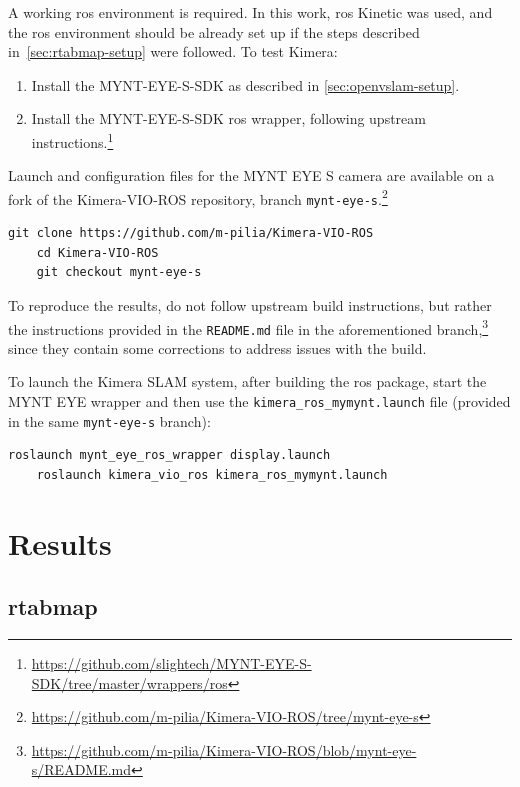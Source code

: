 \documentclass[11pt, letterpaper, twoside]{article}
\begin{document}
A working \gls{ros} environment is required. In this work, \gls{ros} Kinetic
was used, and the \gls{ros} environment should be already set up if the steps
described in~\cref{sec:rtabmap-setup} were followed. To test Kimera:

\begin{enumerate}
    \item Install the MYNT-EYE-S-SDK as described in \cref{sec:openvslam-setup}.

    \item Install the MYNT-EYE-S-SDK \gls{ros} wrapper, following upstream
        instructions.\footnote{\url{https://github.com/slightech/MYNT-EYE-S-SDK/tree/master/wrappers/ros}}
\end{enumerate}

Launch and configuration files for the MYNT EYE S camera are available on a
fork of the Kimera-VIO-ROS repository, branch
\texttt{mynt-eye-s}.\footnote{\url{https://github.com/m-pilia/Kimera-VIO-ROS/tree/mynt-eye-s}}

\begin{Verbatim}[samepage=true]
    git clone https://github.com/m-pilia/Kimera-VIO-ROS
    cd Kimera-VIO-ROS
    git checkout mynt-eye-s
\end{Verbatim}

To reproduce the results, do not follow upstream build instructions, but rather
the instructions provided in the \texttt{README.md} file in the aforementioned
branch,\footnote{\url{https://github.com/m-pilia/Kimera-VIO-ROS/blob/mynt-eye-s/README.md}}
since they contain some corrections to address issues with the build.

To launch the Kimera SLAM system, after building the \gls{ros} package, start
the MYNT EYE wrapper and then use the \texttt{kimera\_ros\_mymynt.launch} file
(provided in the same \texttt{mynt-eye-s} branch):
\begin{Verbatim}[samepage=true]
    roslaunch mynt_eye_ros_wrapper display.launch
    roslaunch kimera_vio_ros kimera_ros_mymynt.launch
\end{Verbatim}

\section{Results}

\subsection{\acs{rtabmap}}
\end{document}

